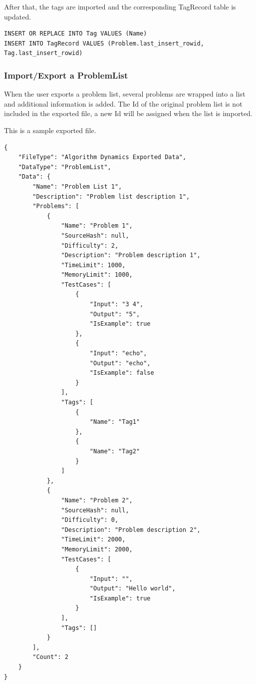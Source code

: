 \documentclass[a4paper]{report}
\begin{document}
After that, the tags are imported and the corresponding TagRecord table is updated.

\begin{verbatim}
INSERT OR REPLACE INTO Tag VALUES (Name)
INSERT INTO TagRecord VALUES (Problem.last_insert_rowid, Tag.last_insert_rowid)
\end{verbatim}

\subsubsection{Import/Export a ProblemList}

When the user exports a problem list, several problems are wrapped into a list and additional information is added. The Id of the original problem list is not included in the exported file, a new Id will be assigned when the list is imported.

This is a sample exported file.

\begin{verbatim}
{
    "FileType": "Algorithm Dynamics Exported Data",
    "DataType": "ProblemList",
    "Data": {
        "Name": "Problem List 1",
        "Description": "Problem list description 1",
        "Problems": [
            {
                "Name": "Problem 1",
                "SourceHash": null,
                "Difficulty": 2,
                "Description": "Problem description 1",
                "TimeLimit": 1000,
                "MemoryLimit": 1000,
                "TestCases": [
                    {
                        "Input": "3 4",
                        "Output": "5",
                        "IsExample": true
                    },
                    {
                        "Input": "echo",
                        "Output": "echo",
                        "IsExample": false
                    }
                ],
                "Tags": [
                    {
                        "Name": "Tag1"
                    },
                    {
                        "Name": "Tag2"
                    }
                ]
            },
            {
                "Name": "Problem 2",
                "SourceHash": null,
                "Difficulty": 0,
                "Description": "Problem description 2",
                "TimeLimit": 2000,
                "MemoryLimit": 2000,
                "TestCases": [
                    {
                        "Input": "",
                        "Output": "Hello world",
                        "IsExample": true
                    }
                ],
                "Tags": []
            }
        ],
        "Count": 2
    }
}
\end{verbatim}
\end{document}
